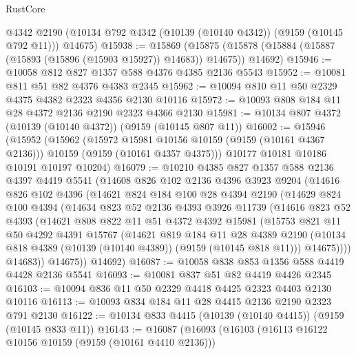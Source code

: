 \begin{lexlean}{RustCore}
\begin{coremodule}
      @4342
      @2190
      (@10134 @792 @4342 (@10139 (@10140 @4342)) (@9159 (@10145 @792 @11)))
      @14675)
@15938 := @15869
    (@15875 (@15878 (@15884 (@15887 (@15893 (@15896 (@15903 @15927)) @14683)) @14675)) @14692)
@15946 := @10058 @812 @827 @1357 @588 @4376 @4385 @2136 @5543
@15952 := @10081 @811 @51 @82 @4376 @4383 @2345
@15962 := @10094 @810 @11 @50 @2329 @4375 @4382 @2323 @4356 @2130 @10116
@15972 := @10093 @808 @184 @11 @28 @4372 @2136 @2190 @2323 @4366 @2130
@15981 := @10134 @807 @4372 (@10139 (@10140 @4372)) (@9159 (@10145 @807 @11))
@16002 := @15946
    (@15952
      (@15962
        (@15972 @15981 @10156 @10159 (@9159 (@10161 @4367 @2136)))
        @10159
        (@9159 (@10161 @4357 @4375)))
      @10177
      @10181
      @10186
      @10191
      @10197
      @10204)
@16079 := @10210
    @4385
    @827
    @1357
    @588
    @2136
    @4397
    @4419
    @5541
    (@14608
      @826
      @102
      @2136
      @4396
      @3923
      @9204
      (@14616
        @826
        @102
        @4396
        (@14621
          @824
          @184
          @100
          @28
          @4394
          @2190
          (@14629
            @824
            @100
            @4394
            (@14634
              @823
              @52
              @2136
              @4393
              @3926
              @11739
              (@14616
                @823
                @52
                @4393
                (@14621
                  @808
                  @822
                  @11
                  @51
                  @4372
                  @4392
                  @15981
                  (@15753
                    @821
                    @11
                    @50
                    @4292
                    @4391
                    @15767
                    (@14621
                      @819
                      @184
                      @11
                      @28
                      @4389
                      @2190
                      (@10134 @818 @4389 (@10139 (@10140 @4389)) (@9159 (@10145 @818 @11)))
                      @14675))))
              @14683))
          @14675))
      @14692)
@16087 := @10058 @838 @853 @1356 @588 @4419 @4428 @2136 @5541
@16093 := @10081 @837 @51 @82 @4419 @4426 @2345
@16103 := @10094 @836 @11 @50 @2329 @4418 @4425 @2323 @4403 @2130 @10116
@16113 := @10093 @834 @184 @11 @28 @4415 @2136 @2190 @2323 @791 @2130
@16122 := @10134 @833 @4415 (@10139 (@10140 @4415)) (@9159 (@10145 @833 @11))
@16143 := @16087
    (@16093
      (@16103
        (@16113 @16122 @10156 @10159 (@9159 (@10161 @4410 @2136)))

\end{coremodule}
\end{lexlean}

